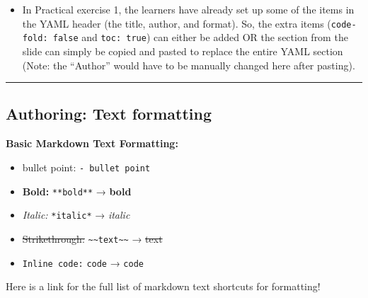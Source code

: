 \documentclass[
  letterpaper,
  DIV=11,
  numbers=noendperiod]{scrartcl}
\providecommand{\tightlist}{%
  \setlength{\itemsep}{0pt}\setlength{\parskip}{0pt}}
\begin{document}
\begin{itemize}
\tightlist
\item
  In Practical exercise 1, the learners have already set up some of the
  items in the YAML header (the title, author, and format). So, the
  extra items (\texttt{code-fold:\ false} and \texttt{toc:\ true}) can
  either be added OR the section from the slide can simply be copied and
  pasted to replace the entire YAML section (Note: the ``Author'' would
  have to be manually changed here after pasting).
\end{itemize}

\begin{center}\rule{0.5\linewidth}{0.5pt}\end{center}

\subsection{Authoring: Text formatting}\label{authoring-text-formatting}

\textbf{Basic Markdown Text Formatting:}

\begin{itemize}
\tightlist
\item
  bullet point: \texttt{-\ bullet\ point}
\item
  \textbf{Bold:} \texttt{**bold**} → \textbf{bold}
\item
  \emph{Italic:} \texttt{*italic*} → \emph{italic}
\item
  \st{Strikethrough:}
  \texttt{\textasciitilde{}\textasciitilde{}text\textasciitilde{}\textasciitilde{}}
  → \st{text}
\item
  \texttt{Inline\ code:} \texttt{\textasciigrave{}code\textasciigrave{}}
  → \texttt{code}
\end{itemize}

\begin{tcolorbox}[enhanced jigsaw, opacitybacktitle=0.6, toptitle=1mm, colbacktitle=quarto-callout-note-color!10!white, toprule=.15mm, left=2mm, colback=white, colframe=quarto-callout-note-color-frame, opacityback=0, bottomtitle=1mm, breakable, titlerule=0mm, rightrule=.15mm, arc=.35mm, title=\textcolor{quarto-callout-note-color}{\faInfo}\hspace{0.5em}{Markdown text shortcuts}, bottomrule=.15mm, coltitle=black, leftrule=.75mm]

Here is a link for the full list of markdown text shortcuts for
formatting!

\end{tcolorbox}
\end{document}
